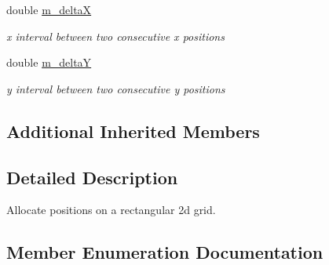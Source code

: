\begin{DoxyCompactItemize}
double \hyperlink{classns3_1_1GridPositionAllocator_a09ae12ea1721ea8c9ad0ac2ea268560e}{m\+\_\+deltaX}
\begin{DoxyCompactList}\small\item\em x interval between two consecutive x positions \end{DoxyCompactList}\item 
double \hyperlink{classns3_1_1GridPositionAllocator_a1e266d88a85f5cf399e5ff5762c23b83}{m\+\_\+deltaY}
\begin{DoxyCompactList}\small\item\em y interval between two consecutive y positions \end{DoxyCompactList}\end{DoxyCompactItemize}
\subsection*{Additional Inherited Members}


\subsection{Detailed Description}
Allocate positions on a rectangular 2d grid. 

\subsection{Member Enumeration Documentation}
